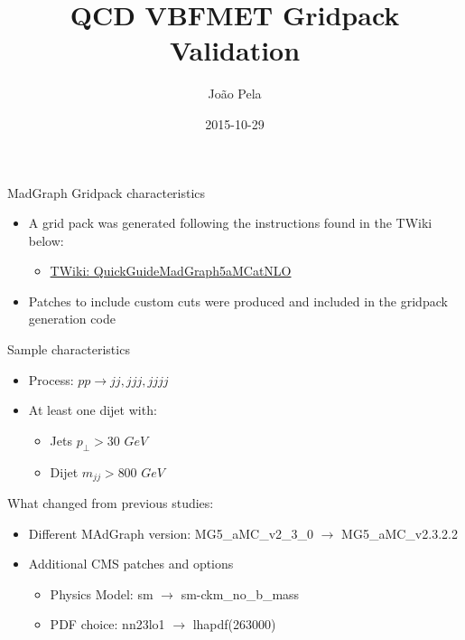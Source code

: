 \documentclass[8pt]{beamer}
\author[J. Pela]{João Pela}
\title{QCD VBFMET Gridpack Validation}
\institute[ICL]{Imperial College London}
\date{2015-10-29}
\begin{document}
\setlength{\unitlength}{1mm}


\begin{frame}
  \titlepage
\end{frame}


\begin{frame}{MadGraph Gridpack characteristics}
  
\begin{itemize}
  \item A grid pack was generated following the instructions found in the TWiki below:
   \begin{itemize}
     \item \href{https://twiki.cern.ch/twiki/bin/viewauth/CMS/QuickGuideMadGraph5aMCatNLO}{TWiki: QuickGuideMadGraph5aMCatNLO}
   \end{itemize}
  \item Patches to include custom cuts were produced and included in the gridpack generation code
\end{itemize}

\begin{block}{Sample characteristics}

\begin{itemize}
  \item Process: $pp \rightarrow jj,jjj,jjjj$
  \item At least one dijet with:
  \begin{itemize}
    \item Jets $p_\perp > 30$ $GeV$
    \item Dijet $m_{jj} > 800$ $GeV$
  \end{itemize}
\end{itemize}

\end{block}

\begin{block}{What changed from previous studies:}

\begin{itemize}
  \item Different MAdGraph version: MG5\_aMC\_v2\_3\_0  $\rightarrow$ MG5\_aMC\_v2.3.2.2 
  \item Additional CMS patches and options
  \begin{itemize}
    \item Physics Model: sm $\rightarrow$ sm-ckm\_no\_b\_mass
    \item PDF choice: nn23lo1 $\rightarrow$ lhapdf(263000)
  \end{itemize}
\end{itemize}


\end{block}
\end{frame}
\end{document}
